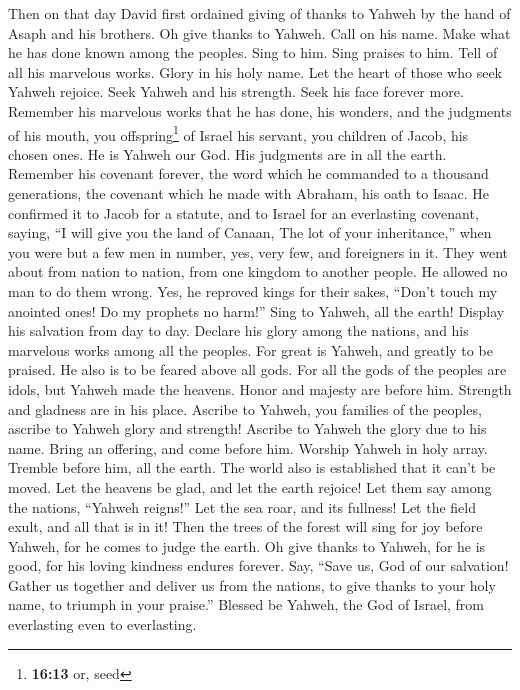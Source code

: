  Then on that day David first ordained giving of thanks to
Yahweh by the hand of Asaph and his brothers.  Oh give
thanks to Yahweh. Call on his name. Make what he has done known among
the peoples.  Sing to him. Sing praises to him. Tell of
all his marvelous works.  Glory in his holy name. Let the
heart of those who seek Yahweh rejoice.  Seek Yahweh and
his strength. Seek his face forever more.  Remember his
marvelous works that he has done, his wonders, and the judgments of his
mouth,  you offspring\footnote{\textbf{16:13} or, seed}
of Israel his servant, you children of Jacob, his chosen ones.
 He is Yahweh our God. His judgments are in all the
earth.  Remember his covenant forever, the word which he
commanded to a thousand generations,  the covenant which
he made with Abraham, his oath to Isaac.  He confirmed it
to Jacob for a statute, and to Israel for an everlasting covenant,
 saying, ``I will give you the land of Canaan, The lot of
your inheritance,''  when you were but a few men in
number, yes, very few, and foreigners in it.  They went
about from nation to nation, from one kingdom to another people.
 He allowed no man to do them wrong. Yes, he reproved
kings for their sakes,  ``Don't touch my anointed ones!
Do my prophets no harm!''  Sing to Yahweh, all the earth!
Display his salvation from day to day.  Declare his glory
among the nations, and his marvelous works among all the peoples.
 For great is Yahweh, and greatly to be praised. He also
is to be feared above all gods.  For all the gods of the
peoples are idols, but Yahweh made the heavens.  Honor
and majesty are before him. Strength and gladness are in his place.
 Ascribe to Yahweh, you families of the peoples, ascribe
to Yahweh glory and strength!  Ascribe to Yahweh the
glory due to his name. Bring an offering, and come before him. Worship
Yahweh in holy array.  Tremble before him, all the earth.
The world also is established that it can't be moved. 
Let the heavens be glad, and let the earth rejoice! Let them say among
the nations, ``Yahweh reigns!''  Let the sea roar, and
its fullness! Let the field exult, and all that is in it!
 Then the trees of the forest will sing for joy before
Yahweh, for he comes to judge the earth.  Oh give thanks
to Yahweh, for he is good, for his loving kindness endures forever.
 Say, ``Save us, God of our salvation! Gather us together
and deliver us from the nations, to give thanks to your holy name, to
triumph in your praise.''  Blessed be Yahweh, the God of
Israel, from everlasting even to everlasting.


